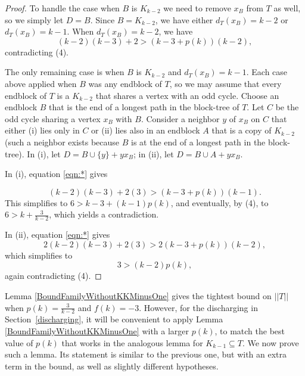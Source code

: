 \documentclass[12pt]{article}
\theoremstyle{plain}
\theoremstyle{definition}
\theoremstyle{remark}
\newcommand{\card}[1]{\left|#1\right|}
\newcommand{\size}[1]{\left\Vert#1\right\Vert}
\begin{document}
\begin{proof}
To handle the case when $B$ is $K_{k-2}$ we need to remove $x_B$ from $T$ as
well, so we simply let $D=B$.  
Since $B=K_{k-2}$, we have either $d_T(x_B) = k - 2$ or $d_T(x_B) =
k-1$. When $d_T(x_B) = k - 2$, we have
	\[(k-2)(k-3) +2 > (k-3 + p(k))(k-2),\]
	contradicting (4).
	
The only remaining case is when $B$ is $K_{k-2}$ and $d_T(x_B) =
k - 1$.  Each case above applied when $B$ was any endblock of $T$, so we may
assume that every endblock of $T$ is a $K_{k-2}$ that shares a vertex with an
odd cycle.  Choose an endblock $B$ that is the end of a longest path in the
block-tree of $T$.  Let $C$ be the odd cycle sharing a vertex $x_B$ with $B$. 
Consider a neighbor $y$ of $x_B$ on $C$ that either (i) lies only in $C$
or (ii) lies also in an endblock $A$ that is a copy of $K_{k-2}$ (such a
neighbor exists because $B$ is at the end of a longest path in the block-tree).
In (i), let $D=B\cup\{y\}+yx_B$; in (ii), let $D=B\cup A+yx_B$.

In (i), equation \eqref{eqn:*} gives

\[(k-2)(k-3)+2(3) > (k-3+p(k))(k-1).\]
%
This simplifies to $6>k-3+(k-1)p(k)$, and eventually, by (4), to $6>k+\frac3{k-2}$, which yields a contradiction.

In (ii), equation \eqref{eqn:*} gives
	\[2(k-2)(k-3) + 2(3) > 2(k-3 + p(k))(k-2),\]
	which simplifies to
	\[3 > (k-2)p(k),\]
	again contradicting (4).
\end{proof}

Lemma \ref{BoundFamilyWithoutKKMinusOne} gives the tightest bound on $||T||$
when $p(k) = \frac{3}{k-2}$ and $f(k) = -3$.   However, for the discharging in
Section~\ref{discharging}, it will be convenient to apply Lemma
\ref{BoundFamilyWithoutKKMinusOne} with a larger $p(k)$, to match the best value
of $p(k)$ that works in the analogous lemma for $K_{k-1}\subseteq T$.  We now
prove such a lemma.  Its statement is similar to the
previous one, but with an extra term in the bound, as well as slightly different hypotheses.
\end{document}
